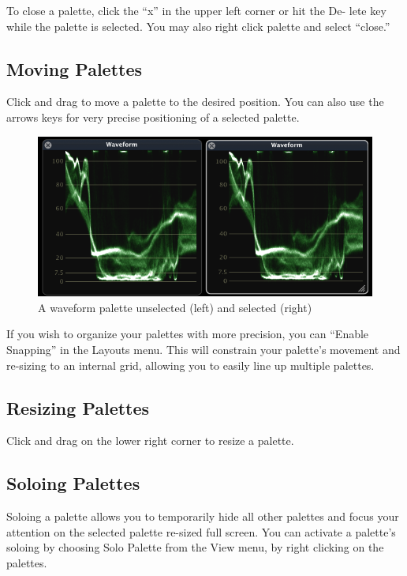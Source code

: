 \documentclass[10,letterpaper,]{report}
\begin{document}
To close a palette, click the ``x'' in the upper left corner or hit the
De- lete key while the palette is selected. You may also right click
palette and select ``close.''

\subsection{Moving Palettes}

Click and drag to move a palette to the desired position. You can also
use the arrows keys for very precise positioning of a selected palette.

\begin{figure}[htbp]
\centering
\includegraphics{images/DualWave.png}
\caption{A waveform palette unselected (left) and selected (right)}
\end{figure}

If you wish to organize your palettes with more precision, you can
``Enable Snapping'' in the Layouts menu. This will constrain your
palette's movement and re-sizing to an internal grid, allowing you to
easily line up multiple palettes.

\subsection{Resizing Palettes}

Click and drag on the lower right corner to resize a palette.

\subsection{Soloing Palettes}

Soloing a palette allows you to temporarily hide all other palettes and
focus your attention on the selected palette re-sized full screen. You
can activate a palette's soloing by choosing Solo Palette from the View
menu, by right clicking on the palettes.
\end{document}
